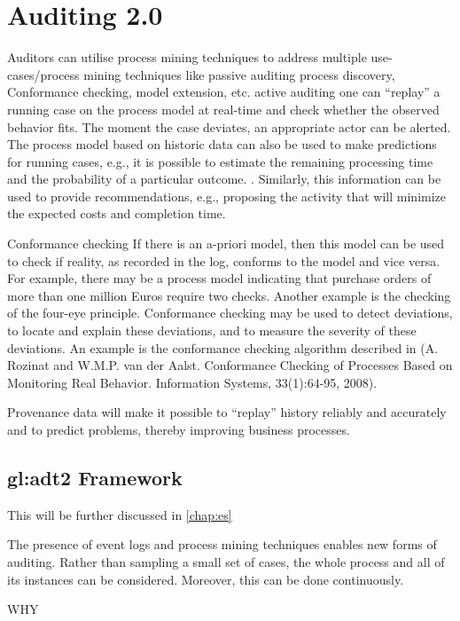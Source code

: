 \section{Auditing 2.0}

Auditors can utilise process mining techniques to address multiple use-cases/process mining techniques like 
passive auditing
process discovery, Conformance checking, model extension, etc.
active auditing
one can “replay” a running
case on the process model at real-time and check whether the observed behavior fits. The moment the
case deviates, an appropriate actor can be alerted. The process model based on historic data can also be
used to make predictions for running cases, e.g., it is possible to estimate the remaining processing time
and the probability of a particular outcome. . Similarly, this information can be used to provide
recommendations, e.g., proposing the activity that will minimize the expected costs and completion
time.

Conformance checking
If there is an a-priori model, then this model can be used to check if reality, as recorded in the log,
conforms to the model and vice versa. For example, there may be a process model indicating that
purchase orders of more than one million Euros require two checks. Another example is the checking of
the four-eye principle. Conformance checking may be used to detect deviations, to locate and explain
these deviations, and to measure the severity of these deviations. An example is the conformance
checking algorithm described in (A. Rozinat and W.M.P. van der Aalst. Conformance Checking of
Processes Based on Monitoring Real Behavior. Information Systems, 33(1):64-95, 2008).

Provenance data will make it possible to “replay” history reliably and accurately and to predict problems, thereby improving business processes.

\subsection{\gls{gl:adt2} Framework}\label{sec:saadt2}

This will be further discussed in \ref{chap:es}

The presence of event logs and process mining techniques enables new forms of auditing. Rather than
sampling a small set of cases, the whole process and all of its instances can be considered. Moreover,
this can be done continuously.

WHY

